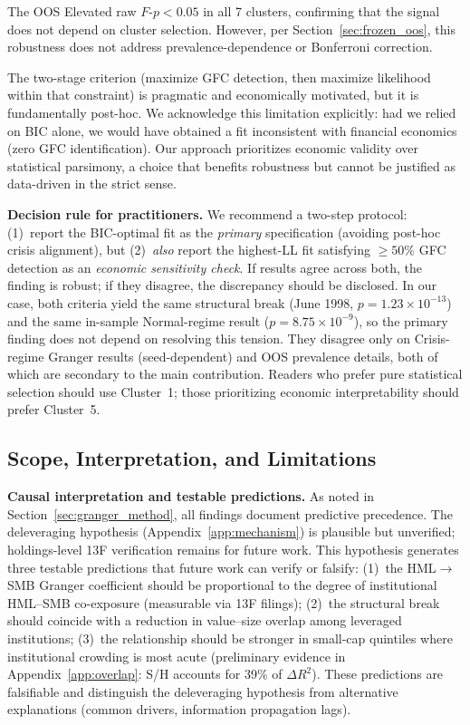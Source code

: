 \documentclass[sigconf,anonymous]{acmart}
\begin{document}
The OOS Elevated raw $F$-$p < 0.05$ in all 7 clusters, confirming that the
signal does not depend on cluster selection. However, per Section~\ref{sec:frozen_oos},
this robustness does not address prevalence-dependence or Bonferroni correction.

The two-stage criterion (maximize GFC detection, then maximize likelihood within that constraint)
is pragmatic and economically motivated, but it is fundamentally post-hoc. We acknowledge this
limitation explicitly: had we relied on BIC alone, we would have obtained a fit inconsistent
with financial economics (zero GFC identification). Our approach prioritizes economic validity
over statistical parsimony, a choice that benefits robustness but cannot be justified as data-driven
in the strict sense.

\textbf{Decision rule for practitioners.} We recommend a two-step protocol:
(1)~report the BIC-optimal fit as the \emph{primary} specification
(avoiding post-hoc crisis alignment), but
(2)~\emph{also} report the highest-LL fit satisfying
$\geq 50\%$ GFC detection as an \emph{economic sensitivity check}.
If results agree across both, the finding is robust; if they disagree,
the discrepancy should be disclosed.
In our case, both criteria yield the same structural break
(June 1998, $p = 1.23 \times 10^{-13}$) and the same in-sample
Normal-regime result ($p = 8.75 \times 10^{-9}$), so the primary
finding does not depend on resolving this tension. They disagree
only on Crisis-regime Granger results (seed-dependent) and OOS
prevalence details, both of which are secondary to the main contribution.
Readers who prefer pure statistical selection should use
Cluster~1; those prioritizing economic interpretability should prefer
Cluster~5.

\subsection{Scope, Interpretation, and Limitations}
\label{sec:limitations}

\textbf{Causal interpretation and testable predictions.}
As noted in Section~\ref{sec:granger_method}, all findings document predictive
precedence. The deleveraging hypothesis (Appendix~\ref{app:mechanism}) is plausible but
unverified; holdings-level 13F verification remains for future work.
This hypothesis generates three testable predictions that future work
can verify or falsify:
(1)~the HML$\to$SMB Granger coefficient should be proportional to the
degree of institutional HML--SMB co-exposure (measurable via 13F filings);
(2)~the structural break should coincide with a reduction in value--size
overlap among leveraged institutions;
(3)~the relationship should be stronger in small-cap quintiles where
institutional crowding is most acute (preliminary evidence in
Appendix~\ref{app:overlap}: S/H accounts for 39\% of $\Delta R^2$).
These predictions are falsifiable and distinguish the deleveraging
hypothesis from alternative explanations (common drivers,
information propagation lags).
\end{document}
